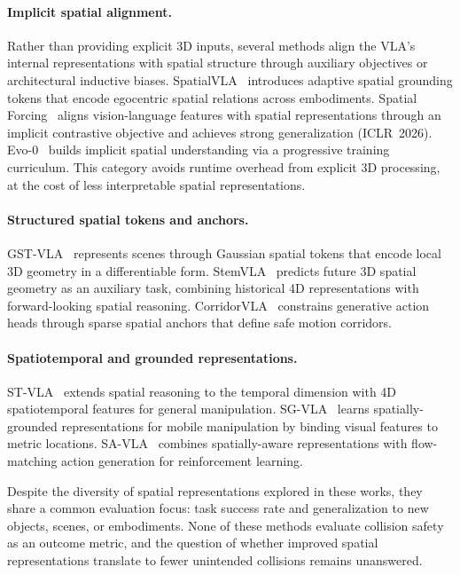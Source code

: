 \paragraph{Implicit spatial alignment.}
Rather than providing explicit 3D inputs, several methods align the VLA's internal representations with spatial structure through auxiliary objectives or architectural inductive biases. SpatialVLA~\cite{wu2025spatialvla} introduces adaptive spatial grounding tokens that encode egocentric spatial relations across embodiments. Spatial Forcing~\cite{li2025spatialforcing} aligns vision-language features with spatial representations through an implicit contrastive objective and achieves strong generalization (ICLR~2026). Evo-0~\cite{evo02025} builds implicit spatial understanding via a progressive training curriculum. This category avoids runtime overhead from explicit 3D processing, at the cost of less interpretable spatial representations.

\paragraph{Structured spatial tokens and anchors.}
GST-VLA~\cite{chen2026gstvla} represents scenes through Gaussian spatial tokens that encode local 3D geometry in a differentiable form. StemVLA~\cite{stemvla2026} predicts future 3D spatial geometry as an auxiliary task, combining historical 4D representations with forward-looking spatial reasoning. CorridorVLA~\cite{corridorvla2026} constrains generative action heads through sparse spatial anchors that define safe motion corridors.

\paragraph{Spatiotemporal and grounded representations.}
ST-VLA~\cite{stvla2026} extends spatial reasoning to the temporal dimension with 4D spatiotemporal features for general manipulation. SG-VLA~\cite{sgvla2026} learns spatially-grounded representations for mobile manipulation by binding visual features to metric locations. SA-VLA~\cite{savla2026} combines spatially-aware representations with flow-matching action generation for reinforcement learning.

Despite the diversity of spatial representations explored in these works, they share a common evaluation focus: task success rate and generalization to new objects, scenes, or embodiments. None of these methods evaluate collision safety as an outcome metric, and the question of whether improved spatial representations translate to fewer unintended collisions remains unanswered.

